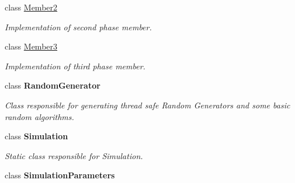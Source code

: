 \begin{DoxyCompactItemize}
class \hyperlink{class_music_population_1_1_member2}{Member2}
\begin{DoxyCompactList}\small\item\em Implementation of second phase member. \end{DoxyCompactList}\item 
class \hyperlink{class_music_population_1_1_member3}{Member3}
\begin{DoxyCompactList}\small\item\em Implementation of third phase member. \end{DoxyCompactList}\item 
class {\bfseries Random\+Generator}
\begin{DoxyCompactList}\small\item\em Class responsible for generating thread safe Random Generators and some basic random algorithms. \end{DoxyCompactList}\item 
class {\bfseries Simulation}
\begin{DoxyCompactList}\small\item\em Static class responsible for Simulation. \end{DoxyCompactList}\item 
class {\bfseries Simulation\+Parameters}
\end{DoxyCompactItemize}
